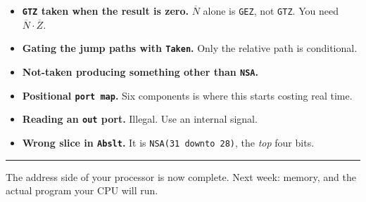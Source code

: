 \documentclass[11pt]{article}
\newcommand{\code}[1]{\texttt{#1}}
\newcommand{\hr}{\vspace{2pt}\hrule\vspace{6pt}}
\begin{document}
\begin{itemize}[leftmargin=1.6em,itemsep=1pt]
\item \textbf{\code{GTZ} taken when the result is zero.} $\overline{N}$ alone is
\code{GEZ}, not \code{GTZ}. You need $\overline{N}\cdot\overline{Z}$.
\item \textbf{Gating the jump paths with \code{Taken}.} Only the relative path
is conditional.
\item \textbf{Not-taken producing something other than \code{NSA}.}
\item \textbf{Positional \code{port map}.} Six components is where this starts
costing real time.
\item \textbf{Reading an \code{out} port.} Illegal. Use an internal signal.
\item \textbf{Wrong slice in \code{Abslt}.} It is \code{NSA(31 downto 28)}, the
\emph{top} four bits.
\end{itemize}

\vspace{10pt}
\hr
{\small The address side of your processor is now complete. Next week: memory,
and the actual program your CPU will run.}
\end{document}
